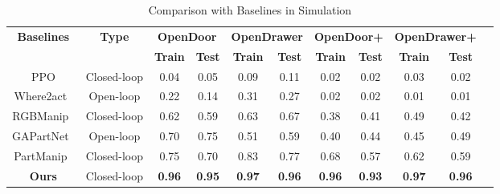 \begin{table*}[ht]
\centering
\setlength{\tabcolsep}{4mm}
\begin{tabular}{c c c c c c c c c c c}
\multicolumn{1}{c}{\multirow{2}{*}{\textbf{Baselines}}} &  \multicolumn{1}{c}{\multirow{2}{*}{\textbf{Type}}} & \multicolumn{2}{c}{\textbf{OpenDoor}} & \multicolumn{2}{c}{\textbf{OpenDrawer}} & \multicolumn{2}{c}{\textbf{OpenDoor+}} & \multicolumn{2}{c}{\textbf{OpenDrawer+}} \\ \cline{3-10}
\textbf{} & \textbf{} & \textbf{Train} & \textbf{Test} & \textbf{Train} & \textbf{Test} & \textbf{Train} & \textbf{Test} & \textbf{Train} & \textbf{Test}\\ \hline
PPO & Closed-loop & 0.04 &  0.05 & 0.09 & 0.11 & 0.02 & 0.02 & 0.03 & 0.02 \\ 
Where2act~\cite{where2act} &  Open-loop & 0.22 & 0.14 & 0.31 & 0.27 & 0.02 & 0.02 & 0.01 & 0.01 \\ 
RGBManip~\cite{rgbmanip} & Closed-loop & 0.62 & 0.59 & 0.63 & 0.67 & 0.38 & 0.41 & 0.49 & 0.42 \\ 
GAPartNet~\cite{gapartnet} & Open-loop & 0.70 & 0.75 & 0.51 & 0.59 & 0.40 & 0.44 & 0.45 & 0.49 \\ 
PartManip~\cite{partmanip} & Closed-loop & 0.75 & 0.70 & 0.83 & 0.77 & 0.68 & 0.57 & 0.62 & 0.59 \\ \hline
\textbf{Ours} & Closed-loop & \textbf{0.96} & \textbf{0.95} & \textbf{0.97} & \textbf{0.96} & \textbf{0.96} & \textbf{0.93} & \textbf{0.97} & \textbf{0.96} \\ 
\end{tabular}
\caption{Comparison with Baselines in Simulation}
\label{table:comparison_baselines}
\end{table*}